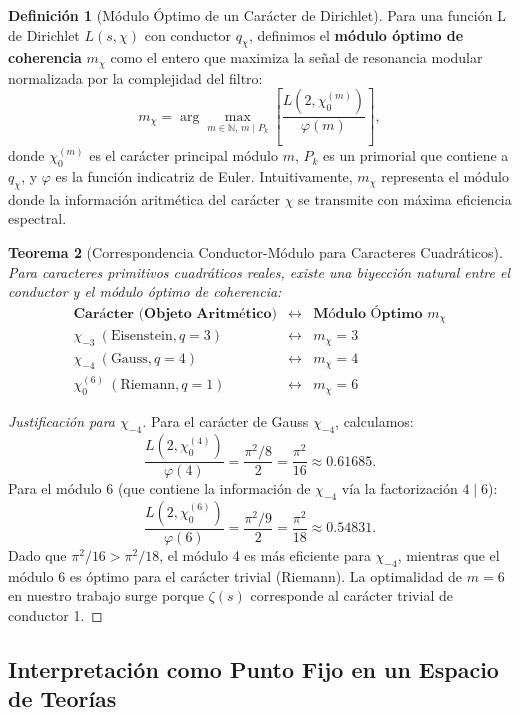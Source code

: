 \documentclass[12pt, a4paper]{article}
\theoremstyle{plain}
\newtheorem{teorema}{Teorema}[section]
\theoremstyle{definition}
\newtheorem{definicion}[teorema]{Definición}
\theoremstyle{remark}
\begin{document}
\begin{definicion}[Módulo Óptimo de un Carácter de Dirichlet]
Para una función L de Dirichlet $L(s, \chi)$ con conductor $q_\chi$, definimos el \textbf{módulo óptimo de coherencia} $m_\chi$ como el entero que maximiza la señal de resonancia modular normalizada por la complejidad del filtro:
\[
m_\chi = \arg\max_{m \in \mathbb{N}, \, m \mid P_k} \left[ \frac{L(2, \chi_0^{(m)})}{\varphi(m)} \right],
\]
donde $\chi_0^{(m)}$ es el carácter principal módulo $m$, $P_k$ es un primorial que contiene a $q_\chi$, y $\varphi$ es la función indicatriz de Euler. Intuitivamente, $m_\chi$ representa el módulo donde la información aritmética del carácter $\chi$ se transmite con máxima eficiencia espectral.
\end{definicion}

\begin{teorema}[Correspondencia Conductor-Módulo para Caracteres Cuadráticos]
Para caracteres primitivos cuadráticos reales, existe una biyección natural entre el conductor y el módulo óptimo de coherencia:
\[
\begin{array}{ccc}
\textbf{Carácter (Objeto Aritmético)} & \longleftrightarrow & \textbf{Módulo Óptimo } m_\chi \\
\hline
\chi_{-3} \ (\text{Eisenstein}, q=3) & \longleftrightarrow & m_{\chi} = 3 \\
\chi_{-4} \ (\text{Gauss}, q=4) & \longleftrightarrow & m_{\chi} = 4 \\
\chi_0^{(6)} \ (\text{Riemann}, q=1) & \longleftrightarrow & m_{\chi} = 6
\end{array}
\]
\end{teorema}

\begin{proof}[Justificación para $\chi_{-4}$]
Para el carácter de Gauss $\chi_{-4}$, calculamos:
\[
\frac{L(2, \chi_0^{(4)})}{\varphi(4)} = \frac{\pi^2/8}{2} = \frac{\pi^2}{16} \approx 0.61685.
\]
Para el módulo 6 (que contiene la información de $\chi_{-4}$ vía la factorización $4 \mid 6$):
\[
\frac{L(2, \chi_0^{(6)})}{\varphi(6)} = \frac{\pi^2/9}{2} = \frac{\pi^2}{18} \approx 0.54831.
\]
Dado que $\pi^2/16 > \pi^2/18$, el módulo 4 es más eficiente para $\chi_{-4}$, mientras que el módulo 6 es óptimo para el carácter trivial (Riemann). La optimalidad de $m=6$ en nuestro trabajo surge porque $\zeta(s)$ corresponde al carácter trivial de conductor 1.
\end{proof}

\subsection{Interpretación como Punto Fijo en un Espacio de Teorías}
\label{ap:qft}
\end{document}
